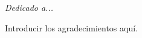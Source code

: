 \pagestyle{empty}

\begin{flushright}
	\Large\textit{Dedicado a...}
\end{flushright}

\vspace{1.0 cm}

Introducir los agradecimientos aquí.